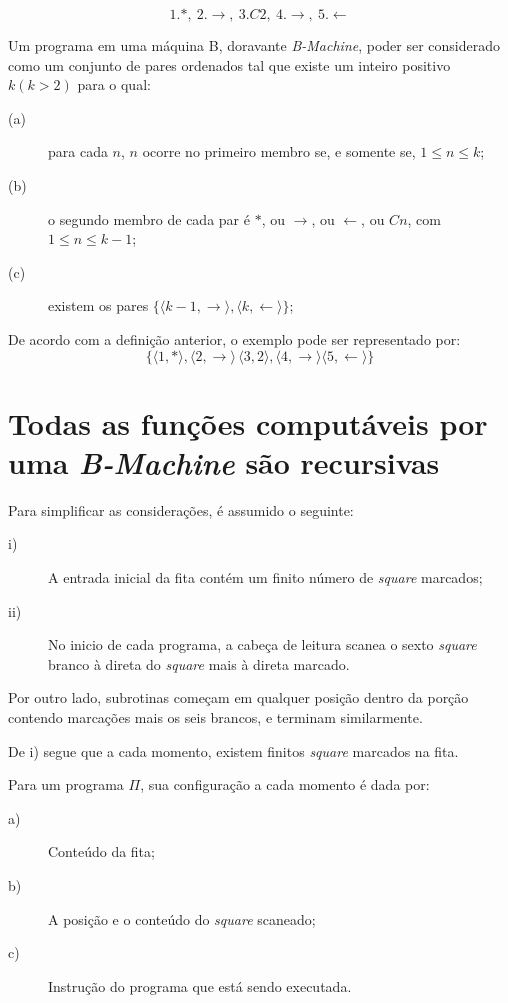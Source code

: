 \documentclass[10pt,letterpaper]{article}
\begin{document}
$$
1.*,\ 2.\rightarrow,\ 3.C2,\ 4.\rightarrow,\ 5.\leftarrow
$$

Um programa em uma m\'aquina B, doravante \textit{B-Machine}, poder ser considerado como um conjunto de pares ordenados tal que existe um inteiro positivo $k (k>2)$ para o qual:

\begin{description}
\item[(a)] para cada $n$, $n$ ocorre no primeiro membro se, e somente se, $1 \le n \le k$;
\item[(b)] o segundo membro de cada par \'e $*$, ou $\rightarrow$, ou $\leftarrow$, ou $Cn$, com $1 \le n \le k-1$;
\item[(c)] existem os pares $\{\langle k-1, \rightarrow \rangle, \langle k, \leftarrow \rangle\}$;
\end{description}

De acordo com a defini\c{c}\~{a}o anterior, o exemplo pode ser representado por:
$$
\{\langle 1,* \rangle, \langle 2,\rightarrow \rangle\, \langle 3,2 \rangle, \langle 4,\rightarrow \rangle \langle 5,\leftarrow \rangle\}
$$

\section{Todas as fun\c{c}\~{o}es comput\'aveis por uma \textit{B-Machine} s\~{a}o recursivas}

Para simplificar as considera\c{c}\~{o}es, \'e assumido o seguinte:
\begin{description}
\item[i)] A entrada inicial da fita cont\'em um finito n\'umero de \textit{square} marcados;
\item[ii)] No inicio de cada programa, a cabe\c{c}a de leitura scanea o sexto \textit{square} branco \`a direta do \textit{square} mais \`a direta marcado.
\end{description}

Por outro lado, subrotinas come\c{c}am em qualquer posi\c{c}\~{a}o dentro da por\c{c}\~{a}o contendo marca\c{c}\~{o}es mais os seis brancos, e terminam similarmente.

De i) segue que a cada momento, existem finitos \textit{square} marcados na fita.\newline

Para um programa $\Pi$, sua configura\c{c}\~{a}o a cada momento \'e dada por:
\begin{description}
\item[a)] Conte\'udo da fita;
\item[b)] A posi\c{c}\~{a}o e o conte\'udo do \textit{square} scaneado;
\item[c)] Instru\c{c}\~{a}o do programa que est\'a sendo executada.
\end{description}
\end{document}
